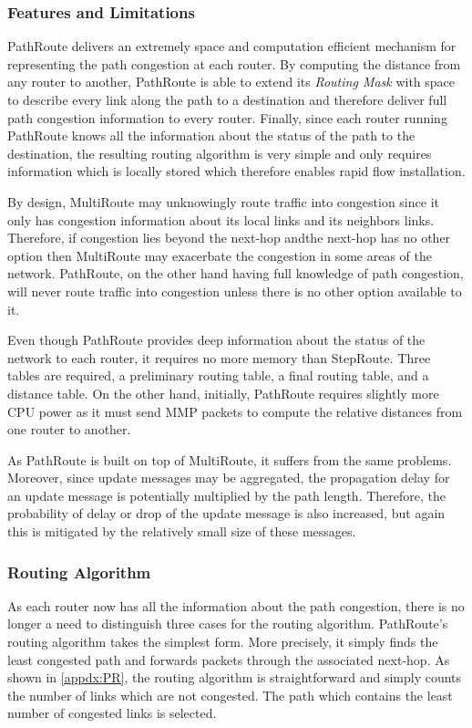 \subsubsection{Features and Limitations}

PathRoute delivers an extremely space and computation efficient mechanism for representing the path congestion at each router. By computing the distance from any router to another, PathRoute is able to extend its \textit{Routing Mask} with space to describe every link along the path to a destination and therefore deliver full path congestion information to every router. Finally, since each router running PathRoute knows all the information about the status of the path to the destination, the resulting routing algorithm is very simple and only requires information which is locally stored which therefore enables rapid flow installation.

By design, MultiRoute may unknowingly route traffic into congestion since it only has congestion information about its local links and its neighbors links. Therefore, if congestion lies beyond the next-hop andthe next-hop has no other option then MultiRoute may exacerbate the congestion in some areas of the network. PathRoute, on the other hand having full knowledge of path congestion, will never route traffic into congestion unless there is no other option available to it. 

Even though PathRoute provides deep information about the status of the network to each router, it requires no more memory than StepRoute. Three tables  are required, a preliminary routing table, a final routing table, and a distance table. On the other hand, initially, PathRoute requires slightly more CPU power as it must send MMP packets to compute the relative distances from one router to another.

As PathRoute is built on top of MultiRoute, it suffers from the same problems. Moreover, since update messages may be aggregated, the propagation delay for an update message is potentially multiplied by the path length. Therefore, the probability of delay or drop of the update message is also increased, but again this is mitigated by the relatively small size of these messages. 

\subsubsection{Routing Algorithm}

As each router now has all the information about the path congestion, there is no longer a need to distinguish three cases for the routing algorithm. PathRoute's routing algorithm takes the simplest form. More precisely, it simply finds the least congested path and forwards packets through the associated next-hop. As shown in \ref{appdx:PR}, the routing algorithm is straightforward and simply counts the number of links which are not congested. The path which contains the least number of congested links is selected.

